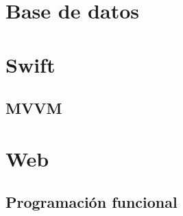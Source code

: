 
\section{Base de datos}

\section{Swift}

\subsection{MVVM}

\section{Web}

\subsection{Programación funcional}